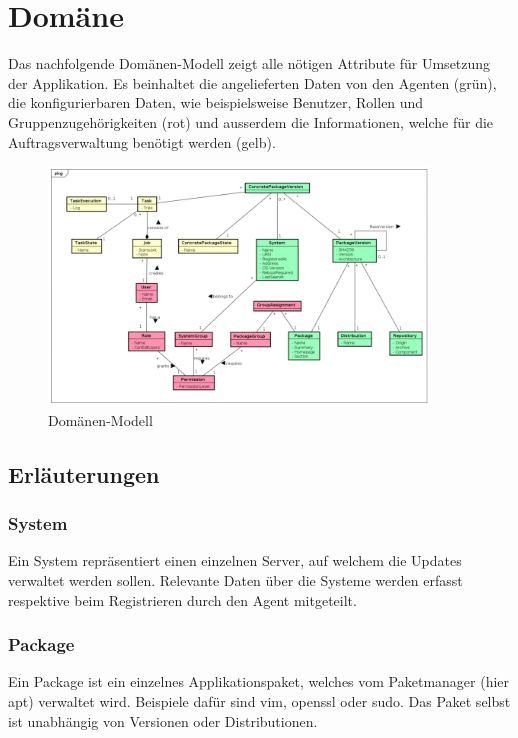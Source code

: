 \section{Domäne}

Das nachfolgende Domänen-Modell zeigt alle nötigen Attribute für Umsetzung der Applikation. Es beinhaltet die angelieferten Daten von den Agenten (grün), die konfigurierbaren Daten, wie beispielsweise Benutzer, Rollen und Gruppenzugehörigkeiten (rot) und ausserdem die Informationen, welche für die Auftragsverwaltung benötigt werden (gelb).

\begin{figure}
  \centering
    \includegraphics[width=0.9\textwidth]{files/DomainModel_small}
  \caption{Domänen-Modell}
  \label{fig:domainmodel}
\end{figure}

\subsection*{Erläuterungen}

\subsubsection{System}

Ein System repräsentiert einen einzelnen Server, auf welchem die Updates verwaltet werden sollen. Relevante Daten über die Systeme werden erfasst respektive beim Registrieren durch den Agent mitgeteilt.

\subsubsection{Package}

Ein Package ist ein einzelnes Applikationspaket, welches vom Paketmanager (hier apt) verwaltet wird. Beispiele dafür sind vim, openssl oder sudo. Das Paket selbst ist unabhängig von Versionen oder Distributionen.

